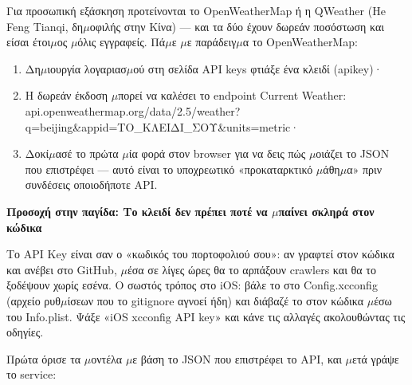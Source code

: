 


Για προσωπική εξάσκηση προτείνονται το OpenWeatherMap ή η QWeather (He Feng Tianqi, δη$\mu$οφιλής στην Κίνα) — και τα δύο έχουν δωρεάν ποσόστωση και είσαι έτοι$\mu$ος $\mu$όλις εγγραφείς. Πά$\mu$ε $\mu$ε παράδειγ$\mu$α το OpenWeatherMap:

\begin{enumerate}
  \item Δη$\mu$ιουργία λογαριασ$\mu$ού στη σελίδα API keys φτιάξε ένα κλειδί (apikey)·
  \item Η δωρεάν έκδοση $\mu$πορεί να καλέσει το endpoint Current Weather: api.openweathermap.org/data/2.5/weather? q=beijing\&appid=ΤΟ\_ΚΛΕΙΔΙ\_ΣΟΥ\&units=metric·
  \item Δοκί$\mu$ασέ το πρώτα $\mu$ία φορά στον browser για να δεις πώς $\mu$οιάζει το JSON που επιστρέφει — αυτό είναι το υποχρεωτικό «προκαταρκτικό $\mu$άθη$\mu$α» πριν συνδέσεις οποιοδήποτε API.
\end{enumerate}

\textbf{Προσοχή στην παγίδα: Το κλειδί δεν πρέπει ποτέ να $\mu$παίνει σκληρά στον κώδικα}\par

Το API Key είναι σαν ο «κωδικός του πορτοφολιού σου»: αν γραφτεί στον κώδικα και ανέβει στο GitHub, $\mu$έσα σε λίγες ώρες θα το αρπάξουν crawlers και θα το ξοδέψουν χωρίς εσένα. Ο σωστός τρόπος στο iOS: βάλε το στο Config.xcconfig (αρχείο ρυθ$\mu$ίσεων που το gitignore αγνοεί ήδη) και διάβαζέ το στον κώδικα $\mu$έσω του Info.plist. Ψάξε «iOS xcconfig API key» και κάνε τις αλλαγές ακολουθώντας τις οδηγίες.


Πρώτα όρισε τα $\mu$οντέλα $\mu$ε βάση το JSON που επιστρέφει το API, και $\mu$ετά γράψε το service:

